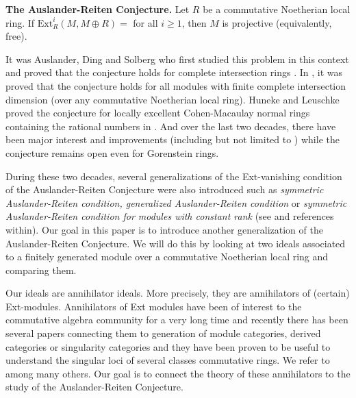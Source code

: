 \documentclass[12pt]{amsart}
\newcommand{\Ext}{\mathrm{Ext}}
\theoremstyle{definition}
\numberwithin{equation}{theorem}
\begin{document}
\textbf{The Auslander-Reiten Conjecture.} Let $R$ be a commutative Noetherian local ring. If $\Ext_R^i(M, M \oplus R)  = $ for all $i \geq 1$, then $M$ is projective (equivalently, free).

It was Auslander, Ding and Solberg who first studied this problem in this context and proved that the conjecture holds for complete intersection rings \cite{Auslander-Ding-Solberg}. In \cite{Araya-Yoshino}, it was proved that the conjecture holds for all modules with finite complete intersection dimension (over any commutative Noetherian local ring). Huneke and Leuschke proved the conjecture for locally excellent Cohen-Macaulay normal rings containing the rational numbers in \cite{Huneke-Leuschke}. And over the last two decades, there have been major interest and improvements (including but not limited to \cite{Araya,Nasseh-Yoshino, Celikbas-Takahashi,Goto-Takahashi,Nasseh-Sather-Wagstaff,Celikbas-Iima-Sadeghi-Takahashi,Sadeghi-Takahashi,Nasseh-Takahashi,Kimura-Otake-Takahashi, Lindo,Avramov-Iyengar-Nasseh, Dey-Ghosh,Ghosh-Takahashi,Kimura-normal}) while the conjecture remains open even for Gorenstein rings. 

During these two decades, several generalizations of the Ext-vanishing condition of the Auslander-Reiten Conjecture were also introduced such as \textit{symmetric Auslander-Reiten condition, generalized Auslander-Reiten condition} or \textit{symmetric Auslander-Reiten condition for modules with constant rank} (see \cite{Huneke-Sega-Vraciu,Wei,Christensen-Holm,Celikbas-Takahashi, Diveris,Dey-Kumashiro-Parangama} and references within). Our goal in this paper is to introduce another generalization of the Auslander-Reiten Conjecture. We will do this by looking at two ideals associated to a finitely generated module over a commutative Noetherian local ring and comparing them.

Our ideals are annihilator ideals. More precisely, they are annihilators of (certain) Ext-modules. Annihilators of Ext modules have been of interest to the commutative algebra community for a very long time and recently there has been several papers connecting them to generation of module categories, derived categories or singularity categories and they have been proven to be useful to understand the singular loci of several classes commutative rings. We refer to \cite{Wang,Iyengar-Takahashi-decomp,Iyengar-Takahashi, Iyengar-Takahashi-jac,Dao-Kobayashi-Takahashi, Dey, Dey-Takahashi, Liu} among many others. Our goal is to connect the theory of these annihilators to the study of the Auslander-Reiten Conjecture.
\end{document}
